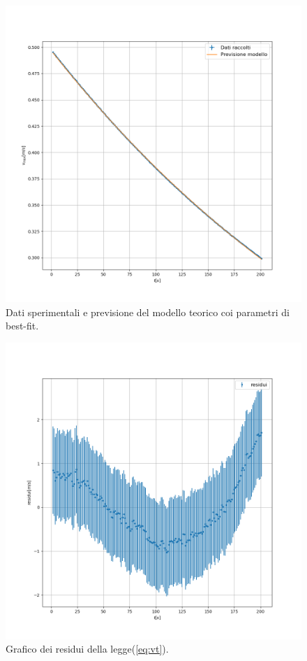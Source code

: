 \documentclass{article}
\begin{document}
\begin{figure}[h!]
	\includegraphics[width=\textwidth]{plot_exp.png}
	\caption{Dati sperimentali e previsione del modello teorico coi parametri di best-fit.}
	\label{fig:vt}
\end{figure}

\begin{figure}[h!]
	\includegraphics[width=\textwidth]{Residuals_exponential_law.png}
	\caption{Grafico dei residui della legge(\ref{eq:vt}).}
	\label{fig:vtres}
\end{figure}
\end{document}

